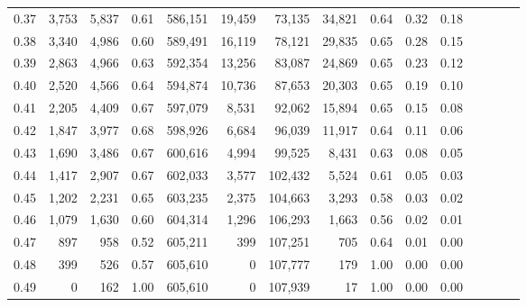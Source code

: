 \begin{tabular}{rrrcrrrrrrrrrrr}
0.37 &   3,753 &  5,837 &                                       0.61 &  586,151 &   19,459 &   73,135 &   34,821 &  0.64 &  0.32 &                         0.18 \\
0.38 &   3,340 &  4,986 &                                       0.60 &  589,491 &   16,119 &   78,121 &   29,835 &  0.65 &  0.28 &                         0.15 \\
0.39 &   2,863 &  4,966 &                                       0.63 &  592,354 &   13,256 &   83,087 &   24,869 &  0.65 &  0.23 &                         0.12 \\
0.40 &   2,520 &  4,566 &                                       0.64 &  594,874 &   10,736 &   87,653 &   20,303 &  0.65 &  0.19 &                         0.10 \\
0.41 &   2,205 &  4,409 &                                       0.67 &  597,079 &    8,531 &   92,062 &   15,894 &  0.65 &  0.15 &                         0.08 \\
0.42 &   1,847 &  3,977 &                                       0.68 &  598,926 &    6,684 &   96,039 &   11,917 &  0.64 &  0.11 &                         0.06 \\
0.43 &   1,690 &  3,486 &                                       0.67 &  600,616 &    4,994 &   99,525 &    8,431 &  0.63 &  0.08 &                         0.05 \\
0.44 &   1,417 &  2,907 &                                       0.67 &  602,033 &    3,577 &  102,432 &    5,524 &  0.61 &  0.05 &                         0.03 \\
0.45 &   1,202 &  2,231 &                                       0.65 &  603,235 &    2,375 &  104,663 &    3,293 &  0.58 &  0.03 &                         0.02 \\
0.46 &   1,079 &  1,630 &                                       0.60 &  604,314 &    1,296 &  106,293 &    1,663 &  0.56 &  0.02 &                         0.01 \\
0.47 &     897 &    958 &                                       0.52 &  605,211 &      399 &  107,251 &      705 &  0.64 &  0.01 &                         0.00 \\
0.48 &     399 &    526 &                                       0.57 &  605,610 &        0 &  107,777 &      179 &  1.00 &  0.00 &                         0.00 \\
0.49 &       0 &    162 &                                       1.00 &  605,610 &        0 &  107,939 &       17 &  1.00 &  0.00 &                         0.00 \\

\end{tabular}

